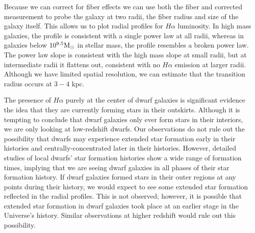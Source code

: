 \documentclass[iop]{emulateapj}
\begin{document}
Because we can correct for fiber effects we can use both the fiber and corrected measurement to probe the galaxy at two radii, the fiber radius and size of the galaxy itself. This allows us to plot radial profiles for $H\alpha$ luminosity. In high mass galaxies, the profile is consistent with a single power law at all radii, whereas in galaxies below $10^{9.5} \rm M_{\odot}$ in stellar mass, the profile resembles a broken power law. The power law slope is consistent with the high mass slope at small radii, but at intermediate radii it flattens out, consistent with no $H\alpha$ emission at larger radii. Although we have limited spatial resolution, we can estimate that the transition radius occurs at $3-4$ kpc.

The presence of $H\alpha$ purely at the center of dwarf galaxies is significant evidence the idea that they are currently forming stars in their outskirts. Although it is tempting to conclude that dwarf galaxies only ever form stars in their interiors, we are only looking at low-redshift dwarfs. Our observations do not rule out the possibility that dwarfs may experience extended star formation early in their histories and centrally-concentrated later in their histories. However, detailed studies of local dwarfs' star formation histories show a wide range of formation times, implying that we are seeing dwarf galaxies in all phases of their star formation history. If dwarf galaxies formed stars in their outer regions at any points during their history, we would expect to see some extended star formation reflected in the radial profiles. This is not observed; however, it is possible that extended star formation in dwarf galaxies took place at an earlier stage in the Universe's history. Similar observations at higher redshift would rule out this possibility.
\end{document}
